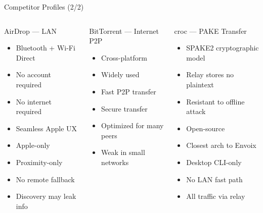\documentclass[xcolor=table,dvipsnames,svgnames,aspectratio=169]{beamer}
\begin{document}
\begin{frame}{Competitor Profiles (2/2)}

\vspace{-2.0em}

\small
\setlength{\itemsep}{0em}
\linespread{0.9}\selectfont
\begin{columns}[t]


\begin{block}{AirDrop --- LAN}
\begin{itemize}
  \item[\faPlus] Bluetooth + Wi-Fi Direct
  \item[\faPlus] No account required
  \item[\faPlus] No internet required
  \item[\faPlus] Seamless Apple UX
  \item[\faMinus] Apple-only
  \item[\faMinus] Proximity-only
  \item[\faMinus] No remote fallback
  \item[\faMinus] Discovery may leak info
\end{itemize}
\end{block}


\begin{block}{BitTorrent --- Internet P2P}
\begin{itemize}
  \item[\faPlus] Cross-platform
  \item[\faPlus] Widely used
  \item[\faPlus] Fast P2P transfer
  \item[\faPlus] Secure transfer
  \item[\faMinus] Optimized for many peers
  \item[\faMinus] Weak in small networks
\end{itemize}
\end{block}


\begin{block}{croc --- PAKE Transfer}
\begin{itemize}
  \item[\faPlus] SPAKE2 cryptographic model
  \item[\faPlus] Relay stores no plaintext
  \item[\faPlus] Resistant to offline attack
  \item[\faPlus] Open-source
  \item[\faPlus] Closest arch to Envoix
  \item[\faMinus] Desktop CLI-only
  \item[\faMinus] No LAN fast path
  \item[\faMinus] All traffic via relay
\end{itemize}
\end{block}

\end{columns}

\end{frame}
\end{document}

